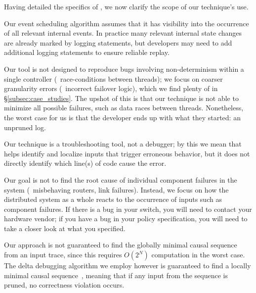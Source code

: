 Having detailed the specifics of \simulator, we now
clarify the scope of our technique's use.

 Our event scheduling algorithm assumes that
it has visibility into the occurrence of all relevant internal events. In
practice many relevant internal state changes are already marked by logging
statements, but developers may need to add additional
logging statements to ensure reliable replay.

 Our tool is not designed to reproduce bugs
involving non-determinism within a single controller (\eg~race-conditions between threads);
we focus on coarser granularity errors (\eg~incorrect failover logic), which we find plenty of
in \S\ref{subsec:case_studies}. The upshot of
this is that our technique is not able to minimize all possible failures, such as
data races between threads.
Nonetheless, the worst case for us is that the developer ends up with what they started:
an unpruned log.


 Our technique is a troubleshooting tool, not a debugger;
by this we mean that \simulator{} helps identify and localize inputs that
trigger erroneous behavior, but it does not directly identify which
line(s) of code cause the error.

 Our goal is not to find the root
cause of individual component failures in the system (\eg~misbehaving routers,
link failures). Instead, we focus on
how the distributed system as a whole reacts to the occurrence of inputs such
as component failures.
If there is a bug in your switch, you will need to contact your hardware vendor;
if you have a bug in your policy specification, you will need to take a closer look at what you specified.

Our approach is not guaranteed to find the globally minimal
causal sequence from an input trace, since this requires $O(2^N)$ computation in the worst case.
The delta debugging algorithm we employ however is guaranteed to find a
locally minimal causal sequence~\cite{Zeller:1999:YMP:318773.318946},
meaning that if any input from the sequence is pruned, no correctness violation
occurs. 


